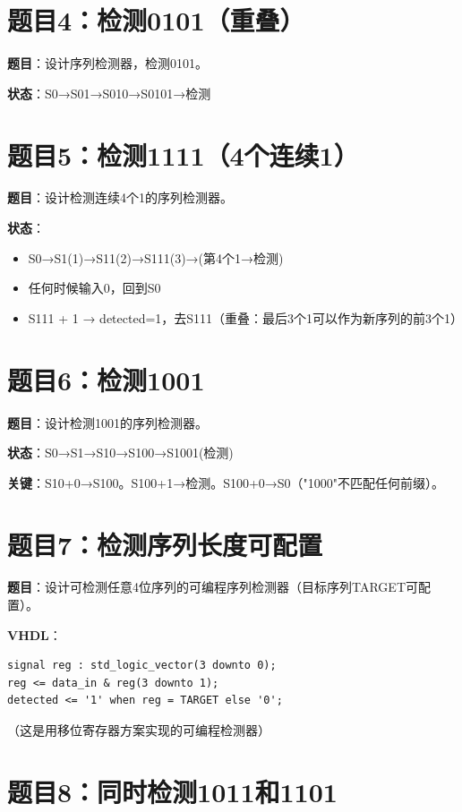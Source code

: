 \section*{题目4：检测0101（重叠）}

\textbf{题目}：设计序列检测器，检测0101。

\textbf{状态}：S0→S01→S010→S0101→检测

\section*{题目5：检测1111（4个连续1）}

\textbf{题目}：设计检测连续4个1的序列检测器。

\textbf{状态}：
\begin{itemize}
  \item S0→S1(1)→S11(2)→S111(3)→(第4个1→检测)
  \item 任何时候输入0，回到S0
  \item S111 + 1 → detected=1，去S111（重叠：最后3个1可以作为新序列的前3个1）
\end{itemize}

\section*{题目6：检测1001}

\textbf{题目}：设计检测1001的序列检测器。

\textbf{状态}：S0→S1→S10→S100→S1001(检测)

\textbf{关键}：S10+0→S100。S100+1→检测。S100+0→S0（"1000"不匹配任何前缀）。

\section*{题目7：检测序列长度可配置}

\textbf{题目}：设计可检测任意4位序列的可编程序列检测器（目标序列TARGET可配置）。

\textbf{VHDL}：
\begin{lstlisting}
signal reg : std_logic_vector(3 downto 0);
reg <= data_in & reg(3 downto 1);
detected <= '1' when reg = TARGET else '0';
\end{lstlisting}
（这是用移位寄存器方案实现的可编程检测器）

\section*{题目8：同时检测1011和1101}

